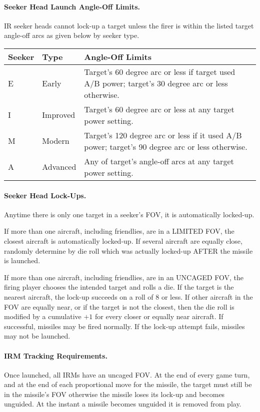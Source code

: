 \paragraph{Seeker Head Launch Angle-Off Limits.} IR seeker heads cannot lock-up a target unless the firer is within the listed target angle-off arcs as given below by seeker type.

\begin{table}[!ht]
\centering
\begin{tabular}{llp{5cm}}
\hline
\textbf{Seeker}  &\textbf{Type}       &\textbf{Angle-Off Limits}\\
\hline
E       &Early      &Target's 60 degree arc or less if target used A/B power; target's 30 degree arc or less otherwise.\\
I       &Improved   &Target's 60 degree arc or less at any target power setting.\\
M       &Modern	    &Target's 120 degree arc or less if it used A/B power; target's 90 degree arc or less otherwise.\\
A       &Advanced   &Any of target's angle-off arcs at any target power setting.\\
\hline
\end{tabular}
\end{table}

\paragraph{Seeker Head Lock-Ups.} Anytime there is only one target in a seeker's FOV, it is automatically locked-up.

If more than one aircraft, including friendlies, are in a LIMITED FOV, the closest aircraft is automatically locked-up. If several aircraft are equally close, randomly determine by die roll which was actually locked-up AFTER the missile is launched.

If more than one aircraft, including friendlies, are in an UNCAGED FOV, the firing player chooses the intended target and rolls a die. If the target is the nearest aircraft, the lock-up succeeds on a roll of 8 or less. If other aircraft in the FOV are equally near, or if the target is not the closest, then the die roll is modified by a cumulative $+1$ for every closer or equally near aircraft. If successful, missiles may be fired normally. If the lock-up attempt fails, missiles may not be launched.

\paragraph{IRM Tracking Requirements.} Once launched, all IRMs have an uncaged FOV. At the end of every game turn, and at the end of each proportional move for the missile, the target must still be in the missile's FOV otherwise the missile loses its lock-up and becomes unguided. At the instant a missile becomes unguided it is removed from play.

